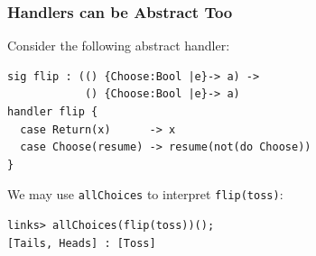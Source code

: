 \documentclass[10pt,compress]{beamer}
\begin{document}
\begin{frame}[fragile]
  \frametitle{Handlers can be Abstract Too}
  Consider the following abstract handler:
\begin{lstlisting}
sig flip : (() {Choose:Bool |e}-> a) ->
            () {Choose:Bool |e}-> a)
handler flip {
  case Return(x)      -> x
  case Choose(resume) -> resume(not(do Choose))
}
\end{lstlisting}
We may use \lstinline$allChoices$ to interpret \lstinline$flip(toss)$:
\begin{lstlisting}[style=terminal]
links> allChoices(flip(toss))();
[Tails, Heads] : [Toss]  
\end{lstlisting}
\end{frame}



\end{document}
